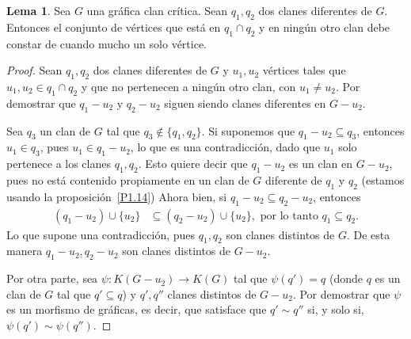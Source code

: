 \documentclass[12pt]{book}
\theoremstyle{definition}
\newtheorem{Lem}[theorem]{Lema}
\begin{document}
\begin{Lem}\label{L1.15}
Sea $G$ una gráfica clan crítica. Sean $q_1,q_2$ dos clanes diferentes de $G$. Entonces el conjunto de vértices que está en $q_1\cap q_2$ y en ningún otro clan debe constar de cuando mucho un solo vértice.
\end{Lem}

\begin{proof}
Sean $q_1,q_2$ dos clanes diferentes de $G$ y $u_1,u_2$ vértices tales que $u_1,u_2\in q_1\cap q_2$ y que no pertenecen a ningún otro clan, con $u_1\neq u_2$. Por demostrar que $q_1-u_2$ y $q_2-u_2$ siguen siendo clanes diferentes en $G-u_2$.

Sea $q_3$ un clan de $G$ tal que $q_3\notin \{q_1,q_2\}$. Si suponemos que $q_1-u_2\subseteq q_3$, entonces $u_1\in q_3$, pues $u_1 \in q_1-u_2$, lo que es una contradicción, dado que $u_1$ solo pertenece a los clanes $q_1,q_2$. Esto quiere decir que $q_{1}-u_{2}$ es un clan en $G-u_{2}$, pues no está contenido propiamente en un clan de $G$ diferente de $q_{1}$ y $q_{2}$ (estamos usando la proposición~\ref{P1.14})
Ahora bien, si $q_1-u_2\subseteq q_2-u_2$, entonces 
\begin{equation*}
\begin{aligned}
(q_1-u_2)\cup\{u_2\} &\subseteq (q_2-u_2)\cup\{u_2\},\text{ por lo tanto }
q_1 \subseteq q_2.
\end{aligned}
\end{equation*}
Lo que supone una contradicción, pues $q_1,q_2$ son clanes distintos de $G$. De esta manera $q_1-u_2,q_2-u_2$ son clanes distintos de $G-u_2$.

Por otra parte, sea $\psi:K(G-u_2)\to K(G)$ tal que $\psi(q')=q$ (donde $q$ es un clan de $G$ tal que $q'\subseteq q$) y $q',q''$ clanes distintos de $G-u_2$. Por demostrar que $\psi$ es un morfismo de gráficas, es decir, que satisface que $q'\sim q''$ si, y solo si, $\psi(q')\sim\psi(q'')$.


\end{proof}
\end{document}
